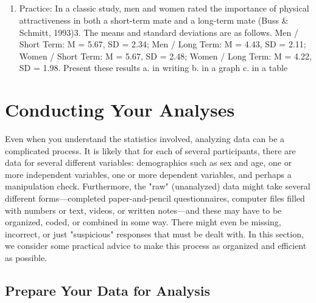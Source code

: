 \subsection{}
\begin{fullwidth}
\begin{enumerate}
\item Practice: In a classic study, men and women rated the importance of physical attractiveness in both a short-term mate and a long-term mate (Buss \& Schmitt, 1993)3. The means and standard deviations are as follows. Men / Short Term: M = 5.67, SD = 2.34; Men / Long Term: M =
4.43, SD = 2.11; Women / Short Term: M = 5.67, SD = 2.48; Women / Long Term: M = 4.22, SD = 1.98. Present these results
a. in writing b. in a graph c. in a table
 
\end{enumerate}
\end{fullwidth}  


\section{Conducting Your Analyses}
  

    
Even when you understand the statistics involved, analyzing data can be a complicated process. It is likely that for each of several participants, there are data for several different variables: demographics such as sex and age, one or more independent variables, one or more dependent variables, and perhaps a manipulation check. Furthermore, the "raw" (unanalyzed) data might take several different forms---completed paper-and-pencil questionnaires, computer files filled with numbers or text, videos, or written notes---and these may have to be organized, coded, or combined in some way. There might even be missing, incorrect, or just "suspicious" responses that must be dealt with. In this section, we consider some practical advice to make this process as organized and efficient as possible.


\subsection{Prepare Your Data for Analysis}



